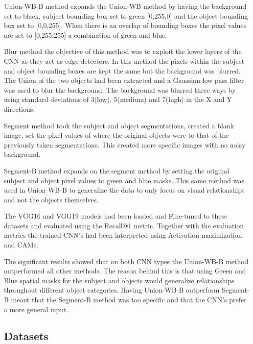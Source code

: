 \documentclass{csfyp}
\begin{document}
Union-WB-B method expands the Union-WB method by having the background set to black, subject bounding box set to green [0,255,0] and the object bounding box set to [0,0,255]. When there is an overlap of bounding boxes the pixel values are set to [0,255,255] a combination of green and blue.

Blur method the objective of this method was to exploit the lower layers of the CNN as they act as edge detectors. In this method the pixels within the subject and object bounding boxes are kept the same but the background was blurred. The Union of the two objects had been extracted and a Gaussian low-pass filter was used to blur the background. The background was blurred three ways by using standard deviations of 3(low), 5(medium) and 7(high) in the X and Y directions. 

Segment method took the subject and object segmentations, created a blank image, set the pixel values of where the original objects were to that of the previously taken segmentations.
This created more specific images with no noisy background. 

Segment-B method expands on the segment method by setting the original subject and object pixel values to green and blue masks. This same method was used in Union-WB-B to generalize the data to only focus on visual relationships and not the objects themselves. 

The VGG16 and VGG19 models had been loaded and Fine-tuned to these datasets and evaluated using the Recall@1 metric. Together with the evaluation metrics the trained CNN’s had been interpreted using Activation maximization and CAMs.

The significant results showed that on both CNN types the Union-WB-B method outperformed all other methods. The reason behind this is that using Green and Blue spatial masks for the subject and objects would generalize relationships throughout different object categories. 
Having Union-WB-B outperform Segment-B meant that the Segment-B method was too specific and that the CNN’s prefer a more general input.

\subsection{Datasets}
\end{document}
